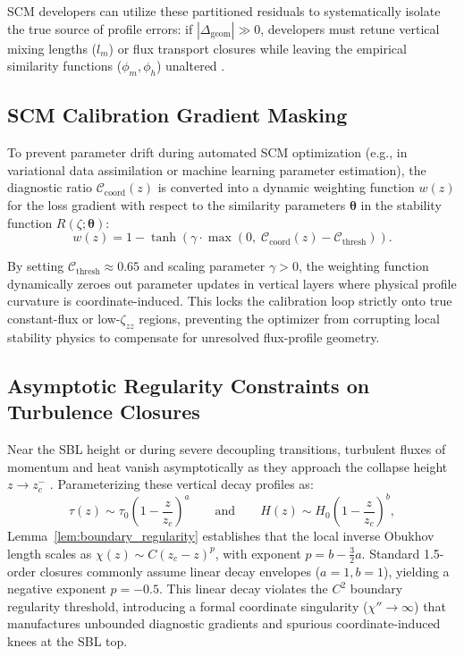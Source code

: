 SCM developers can utilize these partitioned residuals to systematically isolate the true source of profile errors: if $|\Delta_{\text{geom}}| \gg 0$, developers must retune vertical mixing lengths ($l_m$) or flux transport closures while leaving the empirical similarity functions ($\phi_m, \phi_h$) unaltered \cite{nieuwstadt1984}.

\subsection{SCM Calibration Gradient Masking}

To prevent parameter drift during automated SCM optimization (e.g., in variational data assimilation or machine learning parameter estimation), the diagnostic ratio $\mathcal{C}_{\text{coord}}(z)$ is converted into a dynamic weighting function $w(z)$ for the loss gradient with respect to the similarity parameters $\boldsymbol{\theta}$ in the stability function $R(\zeta; \boldsymbol{\theta})$:
\begin{equation}
    w(z) = 1 - \tanh\left( \gamma \cdot \max\left(0, \; \mathcal{C}_{\text{coord}}(z) - \mathcal{C}_{\text{thresh}}\right) \right). \label{eq:loss_gradient_mask}
\end{equation}

By setting $\mathcal{C}_{\text{thresh}} \approx 0.65$ and scaling parameter $\gamma > 0$, the weighting function dynamically zeroes out parameter updates in vertical layers where physical profile curvature is coordinate-induced. This locks the calibration loop strictly onto true constant-flux or low-$\zeta_{zz}$ regions, preventing the optimizer from corrupting local stability physics to compensate for unresolved flux-profile geometry.

\subsection{Asymptotic Regularity Constraints on Turbulence Closures}

Near the SBL height or during severe decoupling transitions, turbulent fluxes of momentum and heat vanish asymptotically as they approach the collapse height $z \to z_c^-$ \cite{nieuwstadt1984}. Parameterizing these vertical decay profiles as:
\begin{equation}
    \tau(z) \sim \tau_0 \left(1 - \frac{z}{z_c}\right)^a \qquad \text{and} \qquad H(z) \sim H_0 \left(1 - \frac{z}{z_c}\right)^b, \label{eq:asymptotic_flux_decay}
\end{equation}
Lemma~\ref{lem:boundary_regularity} establishes that the local inverse Obukhov length scales as $\chi(z) \sim C(z_c-z)^p$, with exponent $p = b - \frac{3}{2}a$. Standard 1.5-order closures commonly assume linear decay envelopes ($a=1, b=1$), yielding a negative exponent $p = -0.5$. This linear decay violates the $C^2$ boundary regularity threshold, introducing a formal coordinate singularity ($\chi'' \to \infty$) that manufactures unbounded diagnostic gradients and spurious coordinate-induced knees at the SBL top.

